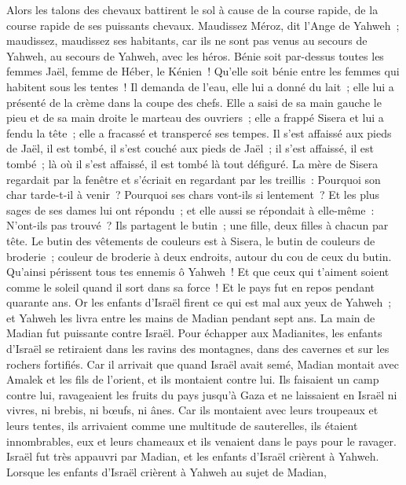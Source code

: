 \begin{multicols}{2}
Alors les talons des chevaux battirent le sol à cause de la course rapide, de la course rapide de ses puissants chevaux.
Maudissez Méroz, dit l'Ange de Yahweh~; maudissez, maudissez ses habitants, car ils ne sont pas venus au secours de Yahweh, au secours de Yahweh, avec les héros.
Bénie soit par-dessus toutes les femmes Jaël, femme de Héber, le Kénien~! Qu'elle soit bénie entre les femmes qui habitent sous les tentes~!
Il demanda de l'eau, elle lui a donné du lait~; elle lui a présenté de la crème dans la coupe des chefs.
Elle a saisi de sa main gauche le pieu et de sa main droite le marteau des ouvriers~; elle a frappé Sisera et lui a fendu la tête~; elle a fracassé et transpercé ses tempes.
Il s'est affaissé aux pieds de Jaël, il est tombé, il s'est couché aux pieds de Jaël~; il s'est affaissé, il est tombé~; là où il s'est affaissé, il est tombé là tout défiguré.
La mère de Sisera regardait par la fenêtre et s'écriait en regardant par les treillis~: Pourquoi son char tarde-t-il à venir~? Pourquoi ses chars vont-ils si lentement~?
 Et les plus sages de ses dames lui ont répondu~; et elle aussi se répondait à elle-même~:
N'ont-ils pas trouvé~? Ils partagent le butin~; une fille, deux filles à chacun par tête. Le butin des vêtements de couleurs est à Sisera, le butin de couleurs de broderie~; couleur de broderie à deux endroits, autour du cou de ceux du butin.
Qu'ainsi périssent tous tes ennemis ô Yahweh~! Et que ceux qui t'aiment soient comme le soleil quand il sort dans sa force~! Et le pays fut en repos pendant quarante ans.
\VerseOne{}Or les enfants d'Israël firent ce qui est mal aux yeux de Yahweh~; et Yahweh les livra entre les mains de Madian pendant sept ans.
La main de Madian fut puissante contre Israël. Pour échapper aux Madianites, les enfants d'Israël se retiraient dans les ravins des montagnes, dans des cavernes et sur les rochers fortifiés.
Car il arrivait que quand Israël avait semé, Madian montait avec Amalek et les fils de l'orient, et ils montaient contre lui.
Ils faisaient un camp contre lui, ravageaient les fruits du pays jusqu'à Gaza et ne laissaient en Israël ni vivres, ni brebis, ni bœufs, ni ânes.
Car ils montaient avec leurs troupeaux et leurs tentes, ils arrivaient comme une multitude de sauterelles, ils étaient innombrables, eux et leurs chameaux et ils venaient dans le pays pour le ravager.
Israël fut très appauvri par Madian, et les enfants d'Israël crièrent à Yahweh.
Lorsque les enfants d'Israël crièrent à Yahweh au sujet de Madian,

\end{multicols}
